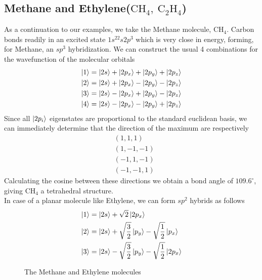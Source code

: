 \documentclass[../qm.tex]{subfiles}
\begin{document}
	\subsection{Methane and Ethylene($\mathrm{CH_4,\ C_2H_4}$)}
	As a continuation to our examples, we take the Methane molecule, $\mathrm{CH_4}$. Carbon bonds readily in an excited state $1s^22s2p^3$ which is very close in energy, forming, for Methane, an $sp^3$ hybridization. We can construct the usual 4 combinations for the wavefunction of the molecular orbitals
	\begin{equation}
		\begin{aligned}
			\ket{1}&=\ket{2s}+\ket{2p_x}+\ket{2p_y}+\ket{2p_z}\\
			\ket{2}&=\ket{2s}+\ket{2p_x}-\ket{2p_y}-\ket{2p_z}\\
			\ket{3}&=\ket{2s}-\ket{2p_x}+\ket{2p_y}-\ket{2p_z}\\
			\ket{4}&=\ket{2s}-\ket{2p_x}-\ket{2p_y}+\ket{2p_z}
		\end{aligned}
		\label{eq:methanewavefunctions}
	\end{equation}
	Since all $\ket{2p_i}$ eigenstates are proportional to the standard euclidean basis, we can immediately determine that the direction of the maximum are respectively
	\begin{equation*}
		\begin{aligned}
			&(1,1,1)\\
			&(1,-1,-1)\\
			&(-1,1,-1)\\
			&(-1,-1,1)
		\end{aligned}
	\end{equation*}
	Calculating the cosine between these directions we obtain a bond angle of $109.6^{\circ}$, giving $\mathrm{CH_4}$ a tetrahedral structure.\\
	In case of a planar molecule like Ethylene, we can form $sp^2$ hybrids as follows
	\begin{equation}
		\begin{aligned}
			\ket{1}&=\ket{2s}+\sqrt{2}\ket{2p_x}\\
			\ket{2}&=\ket{2s}+\sqrt{\frac{3}{2}}\ket{p_y}-\sqrt{\frac{1}{2}}\ket{p_x}\\
			\ket{3}&=\ket{2s}-\sqrt{\frac{3}{2}}\ket{p_y}-\sqrt{\frac{1}{2}}\ket{2p_x}
		\end{aligned}
		\label{eq:ethylene}
	\end{equation}
	\begin{figure}[H]
		\centering
		\qquad\qquad{}
		\label{fig:methaneethylene}
		\caption{The Methane and Ethylene molecules}
	\end{figure}
\end{document}
